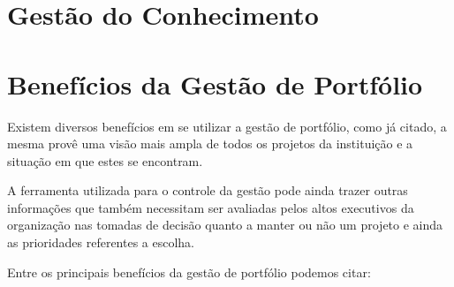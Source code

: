 \documentclass[12pt,a4paper,ruledheader,tocpage=prefix,floatnumber=continuous,pagestart=folhaderosto,font=times]{abnt}
\begin{document}
\section{Gestão do Conhecimento}

\section{Benefícios da Gestão de Portfólio}
Existem diversos benefícios em se utilizar a gestão de portfólio, como já citado, a mesma provê uma visão mais ampla de todos os projetos da instituição 
e a situação em que estes se encontram.

A ferramenta utilizada para o controle da gestão pode ainda trazer outras informações que também necessitam ser avaliadas pelos altos executivos da 
organização nas tomadas de decisão quanto a manter ou não um projeto e ainda as prioridades referentes a escolha.

Entre os principais benefícios da gestão de portfólio podemos citar:\cite{atila}
\end{document}
